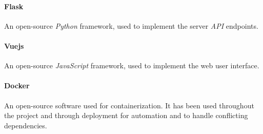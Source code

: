 \paragraph{Flask}
An open-source \emph{Python} framework, used to implement the server \emph{API} endpoints.

\paragraph{Vuejs}
An open-source \emph{JavaScript} framework, used to implement the web user interface.

\paragraph{Docker}
An open-source software used for containerization. It has been used throughout the project and through deployment for automation and to handle conflicting dependencies.
